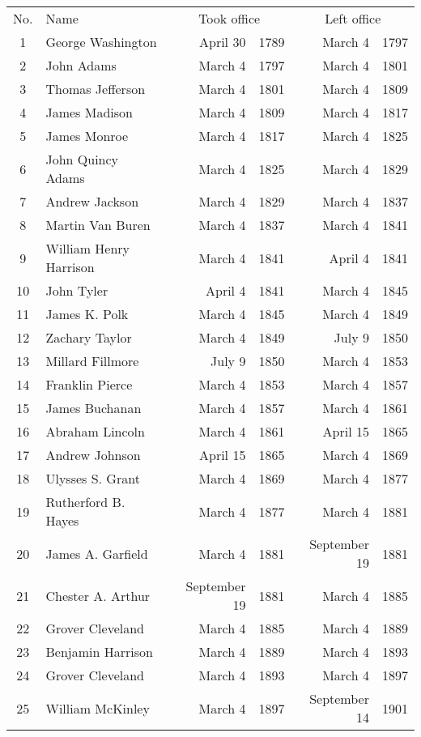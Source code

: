 \begin{longtable}{c|l r@{,}l @{$\rightarrow$} r@{,}l}
	No. & Name & \multicolumn{2}{c}{Took office} & \multicolumn{2}{c}{Left
office}\\
1 & George Washington & April 30& 1789 & March 4& 1797\\
2 & John Adams & March 4& 1797 & March 4& 1801\\
3 & Thomas Jefferson & March 4& 1801 & March 4& 1809\\
4 & James Madison & March 4& 1809 & March 4& 1817\\
5 & James Monroe & March 4& 1817 & March 4& 1825\\
6 & John Quincy Adams & March 4& 1825 & March 4& 1829\\
7 & Andrew Jackson & March 4& 1829 & March 4& 1837\\
8 & Martin Van Buren & March 4& 1837 & March 4& 1841\\
9 & William Henry Harrison & March 4& 1841 & April 4& 1841\\
10 & John Tyler & April 4& 1841 & March 4& 1845\\
11 & James K. Polk & March 4& 1845 & March 4& 1849\\
12 & Zachary Taylor & March 4& 1849 & July 9& 1850\\
13 & Millard Fillmore & July 9& 1850 & March 4& 1853\\
14 & Franklin Pierce & March 4& 1853 & March 4& 1857\\
15 & James Buchanan & March 4& 1857 & March 4& 1861\\
16 & Abraham Lincoln & March 4& 1861 & April 15& 1865\\
17 & Andrew Johnson & April 15& 1865 & March 4& 1869\\
18 & Ulysses S. Grant & March 4& 1869 & March 4& 1877\\
19 & Rutherford B. Hayes & March 4& 1877 & March 4& 1881\\
20 & James A. Garfield & March 4& 1881 & September 19& 1881\\
21 & Chester A. Arthur & September 19& 1881 & March 4& 1885\\
22 & Grover Cleveland & March 4& 1885 & March 4& 1889\\
23 & Benjamin Harrison & March 4& 1889 & March 4& 1893\\
24 & Grover Cleveland & March 4& 1893 & March 4& 1897\\
25 & William McKinley & March 4& 1897 & September 14& 1901\\

\end{longtable}
